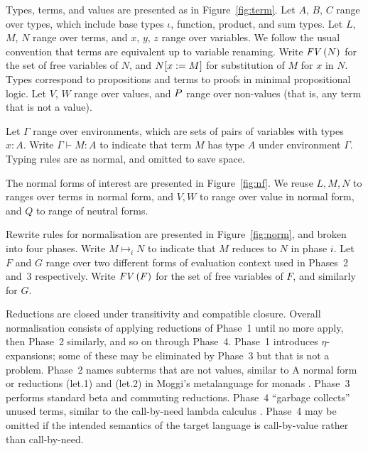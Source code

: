 Types, terms, and values are presented as in Figure~\ref{fig:term}.
Let $A$, $B$, $C$ range over types, which include base types
$\iota$, function, product, and sum types. 
Let $L$, $M$, $N$ range over terms, and $x$, $y$, $z$ range
over variables. We follow the usual convention that terms are
equivalent up to variable renaming. Write $\text{\textit{FV}}\,(N)$ for the set of
free variables of $N$, and $N[x:=M]$ for
substitution of $M$ for $x$ in $N$. Types correspond to
propositions and terms to proofs in minimal propositional logic.
Let $V$, $W$ range over values, and
$P$ range over non-values (that is, any term that is not a value).

Let $\Gamma$ range over environments, which are sets of pairs
of variables with types $x:A$. Write $\Gamma \vdash M:A$ to indicate
that term $M$ has type $A$ under environment $\Gamma$.
Typing rules are as normal, and omitted to save space.

The normal forms of interest are presented in Figure~\ref{fig:nf}.
We reuse $L,M,N$ to ranges over terms in normal form, and
$V,W$ to range over value in normal form, and $Q$ to range of
neutral forms.

Rewrite rules for normalisation are presented in Figure~\ref{fig:norm},
and broken into four phases. Write $M \mapsto_i N$ to indicate
that $M$ reduces to $N$ in phase $i$.  Let $F$ and $G$ range over two
different forms of evaluation context used in Phases~2 and~3
respectively. Write $\text{\textit{FV}}\,(F)$ for the set of free variables of $F$, and
similarly for $G$.

Reductions are closed under transitivity and compatible closure.
Overall normalisation consists of applying reductions of Phase~1 until
no more apply, then Phase~2 similarly, and so on through Phase~4.
Phase~1 introduces $\eta$-expansions; some of these may be eliminated by
Phase~3 but that is not a problem. Phase~2 names subterms that are
not values, similar to A normal form \citep{a-normal-form} or
reductions (let.1) and (let.2) in Moggi's metalanguage for monads
\citep{moggi}. Phase~3 performs standard beta and commuting reductions.
Phase~4 ``garbage collects'' unused terms, similar to the
call-by-need lambda calculus \citep{call-by-need}.
Phase~4 may be omitted if the intended semantics of the target
language is call-by-value rather than call-by-need.


